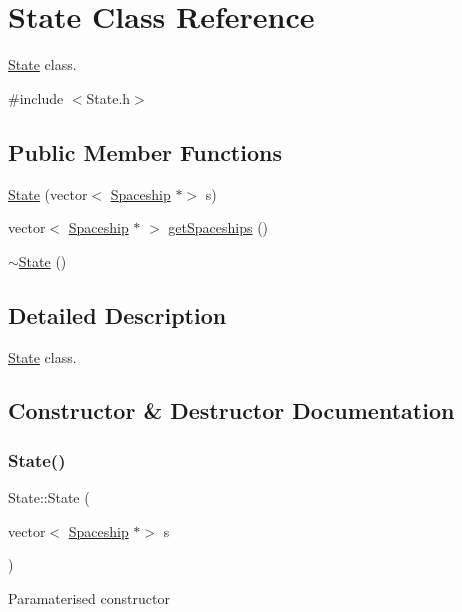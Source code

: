 \hypertarget{classState}{}\section{State Class Reference}
\label{classState}


\hyperlink{classState}{State} class.  




{\ttfamily \#include $<$State.\+h$>$}

\subsection*{Public Member Functions}
\begin{DoxyCompactItemize}
\item 
\hyperlink{classState_a3b9d402f401b3fec7e1dc863c41eadf7}{State} (vector$<$ \hyperlink{classSpaceship}{Spaceship} $\ast$$>$ s)
\item 
vector$<$ \hyperlink{classSpaceship}{Spaceship} $\ast$ $>$ \hyperlink{classState_a9b00d603ca0a944decf08d096f8b724d}{get\+Spaceships} ()
\item 
\hyperlink{classState_afab438d92b90dc18d194dbd9c9c8bab3}{$\sim$\+State} ()
\end{DoxyCompactItemize}


\subsection{Detailed Description}
\hyperlink{classState}{State} class. 

\subsection{Constructor \& Destructor Documentation}
\mbox{\label{classState_a3b9d402f401b3fec7e1dc863c41eadf7}} 
\subsubsection{\texorpdfstring{State()}{State()}}
{\footnotesize\ttfamily State\+::\+State (\begin{DoxyParamCaption}\item[{vector$<$ \hyperlink{classSpaceship}{Spaceship} $\ast$$>$}]{s }\end{DoxyParamCaption})}

Paramaterised constructor \mbox{\label{classState_afab438d92b90dc18d194dbd9c9c8bab3}} 
